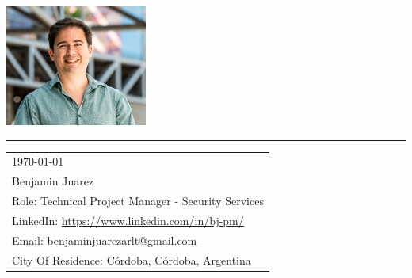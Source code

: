 
\includegraphics[width=0.35\textwidth]{pic.png} %
\vspace{-1em} %
\rule{\linewidth}{1pt} %
\bigskip\bigskip %



\hfill
\begin{tabular}{l @{}}
	\today \bigskip\\ %
	Benjamin Juarez \smallskip \\
	Role: 
	Technical Project Manager - Security Services
	\\ %
	LinkedIn: \href{https://www.linkedin.com/in/bj-pm/?locale=en_US}{https://www.linkedin.com/in/bj-pm/} \\
	Email: \href{benjaminjuarezarlt@gmail.com}{benjaminjuarezarlt@gmail.com} \\
	City Of Residence: Córdoba, Córdoba, Argentina
\end{tabular}

